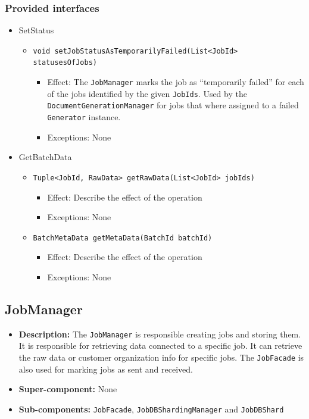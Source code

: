 \documentclass[a4paper,10pt]{article}
\begin{document}
\subsubsection*{Provided interfaces}
\begin{itemize}
    \item SetStatus
    \begin{itemize}
        \item \texttt{void setJobStatusAsTemporarilyFailed(List<JobId> statusesOfJobs)}
        \begin{itemize}
            \item Effect: The \texttt{JobManager} marks the job as ``temporarily failed'' for each of the jobs identified by the given \texttt{JobIds}. Used by the \texttt{DocumentGenerationManager} for jobs that where assigned to a failed \texttt{Generator} instance.
            \item Exceptions: None
        \end{itemize}
    \end{itemize}
    
	\item GetBatchData
    \begin{itemize}
        \item \texttt{Tuple<JobId, RawData> getRawData(List<JobId> jobIds)}
        \begin{itemize}
            \item Effect: Describe the effect of the operation
            \item Exceptions: None
        \end{itemize}
        \item \texttt{BatchMetaData getMetaData(BatchId batchId)}
        \begin{itemize}
            \item Effect: Describe the effect of the operation
            \item Exceptions: None
        \end{itemize}
    \end{itemize}   
\end{itemize}

\subsection{JobManager}
\begin{itemize}
    \item \textbf{Description:} The \texttt{JobManager} is responsible creating jobs and storing them. It is responsible for retrieving data connected to a specific job. It can retrieve the raw data or customer organization info for specific jobs. The \texttt{JobFacade} is also used for marking jobs as sent and received.
    \item \textbf{Super-component:} None
    \item \textbf{Sub-components:} \texttt{JobFacade}, \texttt{JobDBShardingManager} and \texttt{JobDBShard}
\end{itemize}
\end{document}
